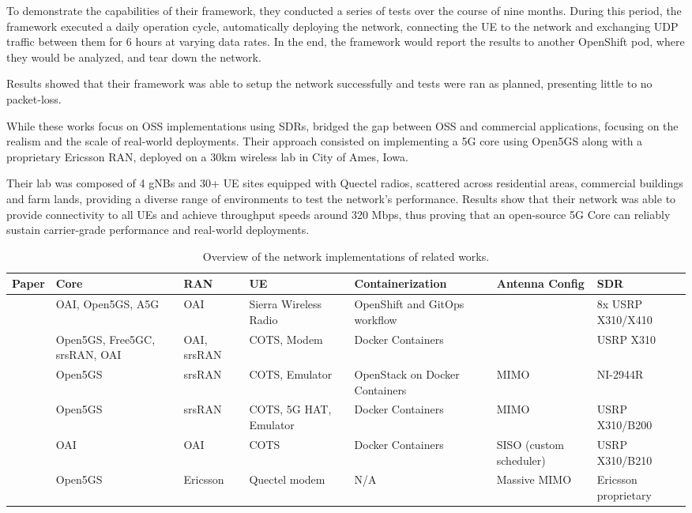 To demonstrate the capabilities of their framework, they conducted a series of tests over the course of nine months. During this period, the framework executed a daily operation cycle, automatically deploying the network, connecting the \gls{UE} to the network and exchanging UDP traffic between them for 6 hours at varying data rates. In the end, the framework would report the results to another OpenShift pod, where they would be analyzed, and tear down the network.

Results showed that their framework was able to setup the network successfully and tests were ran as planned, presenting little to no packet-loss.

\bigskip
While these works focus on \gls{OSS} implementations using \glspl{SDR}, \textcite{zu2025realworld} bridged the gap between \gls{OSS} and commercial applications, focusing on the realism and the scale of real-world deployments. Their approach consisted on implementing a 5G core using Open5GS along with a proprietary Ericsson \gls{RAN}, deployed on a 30km wireless lab in City of Ames, Iowa.

Their lab was composed of 4 \glspl{gNB} and 30+ \gls{UE} sites equipped with Quectel radios, scattered across residential areas, commercial buildings and farm lands, providing a diverse range of environments to test the network's performance. Results show that their network was able to provide connectivity to all \glspl{UE} and achieve throughput speeds around 320 Mbps, thus proving that an open-source 5G Core can reliably sustain carrier-grade performance and real-world deployments. 

\begin{table}[htbp]
\centering
\footnotesize
\begin{tabularx}{\textwidth}{|p{0.9cm}|p{1.3cm}|p{1.3cm}|p{1.6cm}|X|p{1.5cm}|p{2.3cm}|}
\hline
\rowcolor{gray!30} 
\textbf{Paper} & \textbf{Core} & \textbf{RAN} & \textbf{UE} & \textbf{Containerization} & \textbf{Antenna Config} & \textbf{SDR} \\ \hline
\cite{bonati2025_5gct} & \gls{OAI}, Open5GS, A5G & \gls{OAI} & Sierra Wireless Radio & OpenShift and GitOps workflow & & 8x USRP X310/X410 \\ \hline
\cite{horstmann2025open5gcube} & Open5GS, Free5GC, srsRAN, \gls{OAI} & \gls{OAI}, srsRAN & COTS, Modem & Docker Containers &  & USRP X310 \\ \hline
\cite{mamushiane2023deploying} & Open5GS & srsRAN & COTS, Emulator & OpenStack on Docker Containers & MIMO & NI-2944R \\ \hline
\cite{tio2025exploring5g} & Open5GS & srsRAN & COTS, 5G HAT, Emulator & Docker Containers & MIMO & USRP X310/B200 \\ \hline
\cite{vazquez2024maq5g} & \gls{OAI} & \gls{OAI} & \gls{COTS} & Docker Containers & SISO (custom scheduler) & USRP X310/B210 \\ \hline
\cite{zu2025realworld} & Open5GS & Ericsson & Quectel modem & N/A & Massive MIMO & Ericsson proprietary\\ \hline
\end{tabularx}
\caption{Overview of the network implementations of related works.}
\label{tab:related_works_comparison}
\end{table}